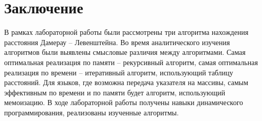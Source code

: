 \chapter{Заключение}

В рамках лабораторной работы были рассмотрены три алгоритма нахождения  расстояния Дамерау -- Левенштейна. Во время аналитического изучения алгоритмов были выявлены смысловые различия между алгоритмами.
Самая оптимальная реализация по памяти -- рекурсивный алгоритм, самая оптимальная реализация по времени -- итеративный алгоритм, использующий таблицу расстояний. Для языков, где возможна передача указателя на массивы, самым эффективным по времени и по памяти будет алгоритм, использующий мемоизацию. 
В ходе лабораторной работы получены навыки динамического программирования, реализованы изученные алгоритмы.